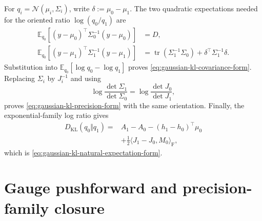 For $q_i=\mathcal N(\mu_i,\Sigma_i)$, write $\delta:=\mu_0-\mu_1$.  The two quadratic expectations needed for the oriented ratio $\log(q_0/q_1)$ are
\begin{equation}
\begin{aligned}
\mathbb E_{q_0}
[(y-\mu_0)^\top\Sigma_0^{-1}(y-\mu_0)]
&=D,\\
\mathbb E_{q_0}
[(y-\mu_1)^\top\Sigma_1^{-1}(y-\mu_1)]
&=\operatorname{tr}(\Sigma_1^{-1}\Sigma_0)
+\delta^\top\Sigma_1^{-1}\delta.
\end{aligned}
\label{eq:gaussian-kl-quadratic-expectations}
\end{equation}
Substitution into $\mathbb E_{q_0}[\log q_0-\log q_1]$ proves \cref{eq:gaussian-kl-covariance-form}.  Replacing $\Sigma_i$ by $J_i^{-1}$ and using
\begin{equation}
\log\frac{\det\Sigma_1}{\det\Sigma_0}
=\log\frac{\det J_0}{\det J_1},
\label{eq:gaussian-kl-determinant-conversion}
\end{equation}
proves \cref{eq:gaussian-kl-precision-form} with the same orientation.  Finally, the exponential-family log ratio gives
\begin{equation}
\begin{aligned}
D_{\mathrm{KL}}(q_0\Vert q_1)
={}&A_1-A_0
-(h_1-h_0)^\top\mu_0\\
&+\frac12\langle J_1-J_0,M_0\rangle_{\mathrm F},
\end{aligned}
\label{eq:natural-expectation-kl-derivation}
\end{equation}
which is \cref{eq:gaussian-kl-natural-expectation-form}.

\section{Gauge pushforward and precision-family closure}

